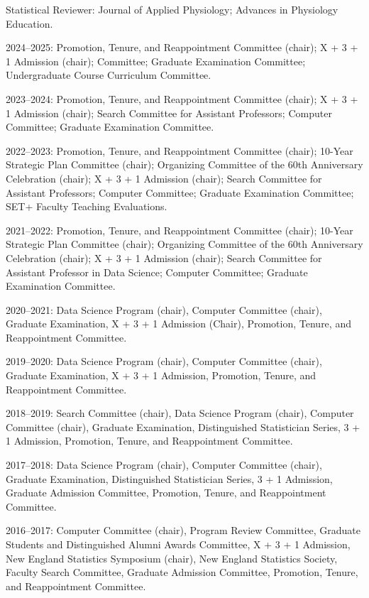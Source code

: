 \documentclass[Statistics]{vita}
\begin{document}
\begin{vita}
\begin{Services}
\begin{JournalReviews}
  \item Statistical Reviewer:  Journal of Applied Physiology; Advances in Physiology Education.
  \end{JournalReviews}
  \begin{DepartmentalService}
  \item 2024--2025: Promotion, Tenure, and Reappointment Committee (chair); X + 3 + 1 Admission (chair); Committee; Graduate Examination Committee; Undergraduate Course Curriculum Committee.
 \item 2023--2024: Promotion, Tenure, and Reappointment Committee (chair); X + 3 + 1 Admission (chair); Search Committee for Assistant Professors; Computer Committee; Graduate Examination Committee.
  \item 2022--2023: Promotion, Tenure, and Reappointment Committee (chair); 10-Year Strategic Plan Committee (chair); Organizing Committee of the 60th Anniversary Celebration (chair); X + 3 + 1 Admission (chair); Search Committee for Assistant Professors; Computer Committee; Graduate Examination Committee; SET+ Faculty Teaching Evaluations.
  \item 2021--2022: Promotion, Tenure, and Reappointment Committee (chair); 10-Year Strategic Plan Committee (chair); Organizing Committee of the 60th Anniversary Celebration (chair); X + 3 + 1 Admission (chair); Search Committee for Assistant Professor in Data Science; Computer Committee; Graduate Examination Committee. 
  \item 2020--2021: Data Science Program (chair), Computer Committee (chair), Graduate Examination,  X + 3 + 1 Admission (Chair), Promotion, Tenure, and Reappointment Committee.
  \item 2019--2020: Data Science Program (chair), Computer Committee (chair), Graduate Examination,  X + 3 + 1 Admission, Promotion, Tenure, and Reappointment Committee.
  \item 2018--2019: Search Committee (chair), Data Science Program (chair), Computer Committee (chair), Graduate Examination, Distinguished Statistician Series, 3 + 1 Admission, Promotion, Tenure, and Reappointment Committee.
  \item 2017--2018: Data Science Program (chair), Computer Committee (chair), Graduate Examination, Distinguished Statistician Series, 3 + 1 Admission, Graduate Admission Committee, Promotion, Tenure, and Reappointment Committee.
  \item 2016--2017: Computer Committee (chair), Program Review Committee, Graduate Students and Distinguished Alumni Awards Committee, X + 3 + 1 Admission, New England Statistics Symposium (chair), New England Statistics Society, Faculty Search Committee, Graduate Admission Committee, Promotion, Tenure, and Reappointment Committee.

\end{DepartmentalService}
\end{Services}
\end{vita}
\end{document}
